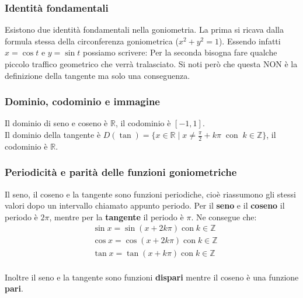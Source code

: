 \subsubsection{Identità fondamentali}
Esistono due identità fondamentali nella goniometria. La prima si ricava dalla formula stessa della circonferenza goniometrica ($x^2+y^2=1$). Essendo infatti $x = \cos{t}$ e $y = \sin{t}$ possiamo scrivere:
Per la seconda bisogna fare qualche piccolo traffico geometrico che verrà tralasciato. Si noti però che questa NON è la definizione della tangente ma solo una conseguenza.

\subsubsection{Dominio, codominio e immagine}
Il dominio di seno e coseno è $\mathbb{R}$, il codominio è $[-1, 1]$.\\
Il dominio della tangente è $D(\tan) = \{x \in \mathbb{R}\; |\; x \neq \frac{\pi}{2} + k\pi\;\; \mathrm{con}\;\; k \in \mathbb{Z}\}$, il codominio è $\mathbb{R}$.

\subsubsection{Periodicità e parità delle funzioni goniometriche}

Il seno, il coseno e la tangente sono funzioni periodiche, cioè riassumono gli stessi valori dopo un intervallo chiamato appunto periodo. Per il \textbf{seno} e il \textbf{coseno} il periodo è $2\pi$, mentre per la \textbf{tangente} il periodo è $\pi$. Ne consegue che:
\begin{align*}
    &\sin{x} = \sin{(x + 2k\pi)}\; \mathrm{con}\; k\in \mathbb{Z}\\
    &\cos{x} = \cos{(x + 2k\pi)}\; \mathrm{con}\; k\in \mathbb{Z}\\
    &\tan{x} = \tan{(x + k\pi)}\; \mathrm{con}\; k\in \mathbb{Z}\\
\end{align*}

Inoltre il seno e la tangente sono funzioni \textbf{dispari} mentre il coseno è una funzione \textbf{pari}.


